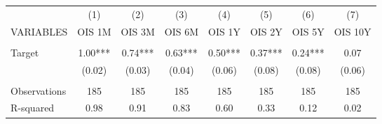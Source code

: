\begin{tabular}{lccccccc} \hline
 & (1) & (2) & (3) & (4) & (5) & (6) & (7) \\
VARIABLES & OIS 1M & OIS 3M & OIS 6M & OIS 1Y & OIS 2Y & OIS 5Y & OIS 10Y \\ \hline
 &  &  &  &  &  &  &  \\
Target & 1.00*** & 0.74*** & 0.63*** & 0.50*** & 0.37*** & 0.24*** & 0.07 \\
 & (0.02) & (0.03) & (0.04) & (0.06) & (0.08) & (0.08) & (0.06) \\
 &  &  &  &  &  &  &  \\
Observations & 185 & 185 & 185 & 185 & 185 & 185 & 185 \\
 R-squared & 0.98 & 0.91 & 0.83 & 0.60 & 0.33 & 0.12 & 0.02 \\ \hline
\end{tabular}
